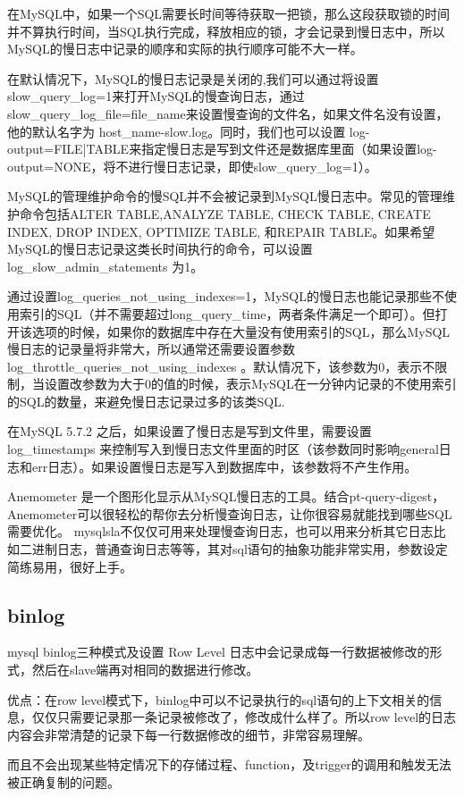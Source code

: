在MySQL中，如果一个SQL需要长时间等待获取一把锁，那么这段获取锁的时间并不算执行时间，当SQL执行完成，释放相应的锁，才会记录到慢日志中，所以MySQL的慢日志中记录的顺序和实际的执行顺序可能不大一样。

在默认情况下，MySQL的慢日志记录是关闭的,我们可以通过将设置slow_query_log=1来打开MySQL的慢查询日志，通过slow_query_log_file=file_name来设置慢查询的文件名，如果文件名没有设置，他的默认名字为 host_name-slow.log。同时，我们也可以设置 log-output={FILE|TABLE}来指定慢日志是写到文件还是数据库里面（如果设置log-output=NONE，将不进行慢日志记录，即使slow_query_log=1）。

MySQL的管理维护命令的慢SQL并不会被记录到MySQL慢日志中。常见的管理维护命令包括ALTER TABLE,ANALYZE TABLE, CHECK TABLE, CREATE INDEX, DROP INDEX, OPTIMIZE TABLE, 和REPAIR TABLE。如果希望MySQL的慢日志记录这类长时间执行的命令，可以设置log_slow_admin_statements 为1。

通过设置log_queries_not_using_indexes=1，MySQL的慢日志也能记录那些不使用索引的SQL（并不需要超过long_query_time，两者条件满足一个即可）。但打开该选项的时候，如果你的数据库中存在大量没有使用索引的SQL，那么MySQL慢日志的记录量将非常大，所以通常还需要设置参数log_throttle_queries_not_using_indexes 。默认情况下，该参数为0，表示不限制，当设置改参数为大于0的值的时候，表示MySQL在一分钟内记录的不使用索引的SQL的数量，来避免慢日志记录过多的该类SQL.

在MySQL 5.7.2 之后，如果设置了慢日志是写到文件里，需要设置log_timestamps 来控制写入到慢日志文件里面的时区（该参数同时影响general日志和err日志）。如果设置慢日志是写入到数据库中，该参数将不产生作用。

Anemometer 是一个图形化显示从MySQL慢日志的工具。结合pt-query-digest，Anemometer可以很轻松的帮你去分析慢查询日志，让你很容易就能找到哪些SQL需要优化。
mysqlsla不仅仅可用来处理慢查询日志，也可以用来分析其它日志比如二进制日志，普通查询日志等等，其对sql语句的抽象功能非常实用，参数设定简练易用，很好上手。

\subsection{binlog }
mysql binlog三种模式及设置
Row Level
日志中会记录成每一行数据被修改的形式，然后在slave端再对相同的数据进行修改。

优点：在row level模式下，binlog中可以不记录执行的sql语句的上下文相关的信息，仅仅只需要记录那一条记录被修改了，修改成什么样了。所以row level的日志内容会非常清楚的记录下每一行数据修改的细节，非常容易理解。

而且不会出现某些特定情况下的存储过程、function，及trigger的调用和触发无法被正确复制的问题。

